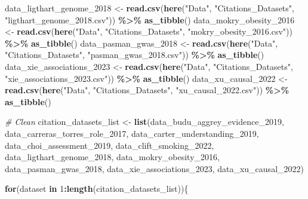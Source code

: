 \documentclass[
]{article}
\newenvironment{Shaded}{\begin{snugshade}}{\end{snugshade}}
\newcommand{\CommentTok}[1]{\textcolor[rgb]{0.56,0.35,0.01}{\textit{#1}}}
\newcommand{\ControlFlowTok}[1]{\textcolor[rgb]{0.13,0.29,0.53}{\textbf{#1}}}
\newcommand{\DecValTok}[1]{\textcolor[rgb]{0.00,0.00,0.81}{#1}}
\newcommand{\FunctionTok}[1]{\textcolor[rgb]{0.13,0.29,0.53}{\textbf{#1}}}
\newcommand{\NormalTok}[1]{#1}
\newcommand{\OtherTok}[1]{\textcolor[rgb]{0.56,0.35,0.01}{#1}}
\newcommand{\SpecialCharTok}[1]{\textcolor[rgb]{0.81,0.36,0.00}{\textbf{#1}}}
\newcommand{\StringTok}[1]{\textcolor[rgb]{0.31,0.60,0.02}{#1}}
\begin{document}
\begin{Shaded}
\begin{Highlighting}[]
\NormalTok{data\_ligthart\_genome\_2018 }\OtherTok{\textless{}{-}} \FunctionTok{read.csv}\NormalTok{(}\FunctionTok{here}\NormalTok{(}\StringTok{"Data"}\NormalTok{, }\StringTok{"Citations\_Datasets"}\NormalTok{, }\StringTok{"ligthart\_genome\_2018.csv"}\NormalTok{)) }\SpecialCharTok{\%\textgreater{}\%} \FunctionTok{as\_tibble}\NormalTok{()}
\NormalTok{data\_mokry\_obesity\_2016 }\OtherTok{\textless{}{-}} \FunctionTok{read.csv}\NormalTok{(}\FunctionTok{here}\NormalTok{(}\StringTok{"Data"}\NormalTok{, }\StringTok{"Citations\_Datasets"}\NormalTok{, }\StringTok{"mokry\_obesity\_2016.csv"}\NormalTok{)) }\SpecialCharTok{\%\textgreater{}\%} \FunctionTok{as\_tibble}\NormalTok{()}
\NormalTok{data\_pasman\_gwas\_2018 }\OtherTok{\textless{}{-}} \FunctionTok{read.csv}\NormalTok{(}\FunctionTok{here}\NormalTok{(}\StringTok{"Data"}\NormalTok{, }\StringTok{"Citations\_Datasets"}\NormalTok{, }\StringTok{"pasman\_gwas\_2018.csv"}\NormalTok{)) }\SpecialCharTok{\%\textgreater{}\%} \FunctionTok{as\_tibble}\NormalTok{()}
\NormalTok{data\_xie\_associations\_2023 }\OtherTok{\textless{}{-}} \FunctionTok{read.csv}\NormalTok{(}\FunctionTok{here}\NormalTok{(}\StringTok{"Data"}\NormalTok{, }\StringTok{"Citations\_Datasets"}\NormalTok{, }\StringTok{"xie\_associations\_2023.csv"}\NormalTok{)) }\SpecialCharTok{\%\textgreater{}\%} \FunctionTok{as\_tibble}\NormalTok{()}
\NormalTok{data\_xu\_causal\_2022 }\OtherTok{\textless{}{-}} \FunctionTok{read.csv}\NormalTok{(}\FunctionTok{here}\NormalTok{(}\StringTok{"Data"}\NormalTok{, }\StringTok{"Citations\_Datasets"}\NormalTok{, }\StringTok{"xu\_causal\_2022.csv"}\NormalTok{)) }\SpecialCharTok{\%\textgreater{}\%} \FunctionTok{as\_tibble}\NormalTok{()}

\CommentTok{\# Clean}
\NormalTok{citation\_datasets\_list }\OtherTok{\textless{}{-}} \FunctionTok{list}\NormalTok{(data\_budu\_aggrey\_evidence\_2019,}
\NormalTok{                               data\_carreras\_torres\_role\_2017,}
\NormalTok{                               data\_carter\_understanding\_2019,}
\NormalTok{                               data\_choi\_assessment\_2019,}
\NormalTok{                               data\_clift\_smoking\_2022,}
\NormalTok{                               data\_ligthart\_genome\_2018,}
\NormalTok{                               data\_mokry\_obesity\_2016,}
\NormalTok{                               data\_pasman\_gwas\_2018,}
\NormalTok{                               data\_xie\_associations\_2023,}
\NormalTok{                               data\_xu\_causal\_2022)}

\ControlFlowTok{for}\NormalTok{(dataset }\ControlFlowTok{in} \DecValTok{1}\SpecialCharTok{:}\FunctionTok{length}\NormalTok{(citation\_datasets\_list))\{}
  

\end{Highlighting}
\end{Shaded}
\end{document}
